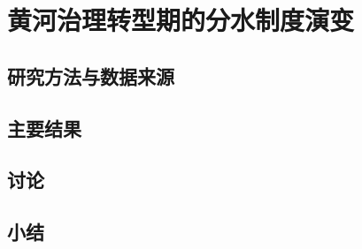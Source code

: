 \chapter{黄河治理转型期的分水制度演变}\label{cha:5}


\section{研究方法与数据来源}\label{ch5:methods}


\section{主要结果}\label{ch5:results}


\section{讨论}\label{ch5:discussion}


\section{小结}\label{ch5:summary}

